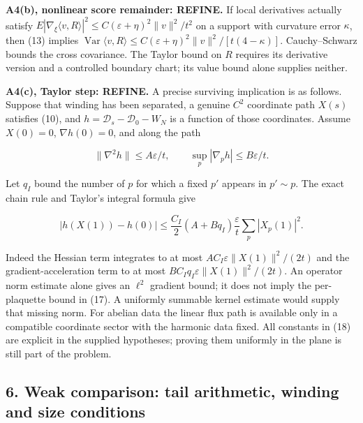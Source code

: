 \documentclass[11pt,a4paper]{article}
\begin{document}
\textbf{A4(b), nonlinear score remainder: REFINE.} If local derivatives
actually satisfy
\(E|\nabla_\xi\langle v,R\rangle|^2\le C(\varepsilon+\eta)^2\|v\|^2/t^2\)
on a support with curvature error \(\kappa\), then (13) implies
\(\operatorname{Var}\langle v,R\rangle\le C(\varepsilon+\eta)^2\|v\|^2/[t(4-\kappa)]\).
Cauchy--Schwarz bounds the cross covariance. The Taylor bound on \(R\)
requires its derivative version and a controlled boundary chart; its
value bound alone supplies neither.

\textbf{A4(c), Taylor step: REFINE.} A precise surviving implication is
as follows. Suppose that winding has been separated, a genuine \(C^2\)
coordinate path \(X(s)\) satisfies (10), and
\(h=\mathcal D_s-\mathcal D_0-W_N\) is a function of those coordinates.
Assume \(X(0)=0\), \(\nabla h(0)=0\), and along the path

\[\|\nabla^2h\|\le A\varepsilon/t,\qquad
\sup_p|\nabla_ph|\le B\varepsilon/t.\tag{17}\]

Let \(q_I\) bound the number of \(p\) for which a fixed \(p'\) appears
in \(p'\sim p\). The exact chain rule and Taylor's integral formula give

\[|h(X(1))-h(0)|\le
\frac{C_I}{2}(A+Bq_I)\frac{\varepsilon}{t}
\sum_p|X_p(1)|^2.\tag{18}\]

Indeed the Hessian term integrates to at most
\(AC_I\varepsilon\|X(1)\|^2/(2t)\) and the gradient-acceleration term to
at most \(BC_Iq_I\varepsilon\|X(1)\|^2/(2t)\). An operator norm estimate
alone gives an \(\ell^2\) gradient bound; it does not imply the
per-plaquette bound in (17). A uniformly summable kernel estimate would
supply that missing norm. For abelian data the linear flux path is
available only in a compatible coordinate sector with the harmonic data
fixed. All constants in (18) are explicit in the supplied hypotheses;
proving them uniformly in the plane is still part of the problem.

\hypertarget{weak-comparison-tail-arithmetic-winding-and-size-conditions}{%
\subsection{6. Weak comparison: tail arithmetic, winding and size
conditions}\label{weak-comparison-tail-arithmetic-winding-and-size-conditions}}
\end{document}
